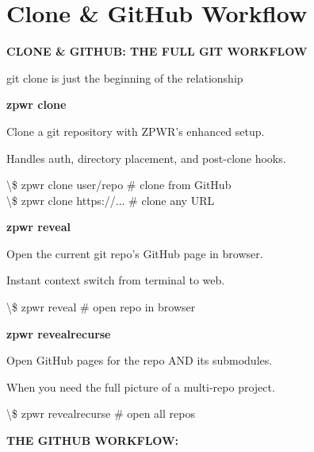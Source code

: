 \documentclass[11pt,a4paper,twoside]{book}
\begin{document}
\section{Clone \& GitHub Workflow}


\vspace{10pt}
{\large\bfseries\color{neoncyan} CLONE \& GITHUB: THE FULL GIT WORKFLOW}\vspace{6pt}

git clone is just the beginning of the relationship


\vspace{12pt}
{\bfseries\color{neonyellow} zpwr clone}\vspace{4pt}

Clone a git repository with ZPWR's enhanced setup.

Handles auth, directory placement, and post-clone hooks.

\begin{codebox}
\textbackslash{}\$ zpwr clone user/repo         \# clone from GitHub\\
\textbackslash{}\$ zpwr clone https://...       \# clone any URL\\
\end{codebox}


\vspace{12pt}
{\bfseries\color{neonyellow} zpwr reveal}\vspace{4pt}

Open the current git repo's GitHub page in browser.

Instant context switch from terminal to web.

\begin{codebox}
\textbackslash{}\$ zpwr reveal                 \# open repo in browser\\
\end{codebox}


\vspace{12pt}
{\bfseries\color{neonyellow} zpwr revealrecurse}\vspace{4pt}

Open GitHub pages for the repo AND its submodules.

When you need the full picture of a multi-repo project.

\begin{codebox}
\textbackslash{}\$ zpwr revealrecurse          \# open all repos\\
\end{codebox}


\vspace{12pt}
{\bfseries\color{neonyellow} THE GITHUB WORKFLOW:}\vspace{4pt}
\end{document}
